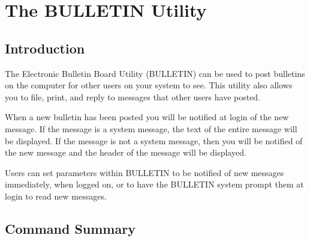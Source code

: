 \chapter{The BULLETIN Utility}
\section{Introduction}
 
The Electronic Bulletin Board Utility (BULLETIN) can be used to post
bulletins on the computer for other users on your system to see.  This
utility also allows you to file, print, and reply to messages that other
users have posted.
 
When a new bulletin has been posted you will be notified at login of the
new message.  If the message is a system message, the text of the entire
message will be displayed.  If the message is not a system message, then
you will be notified of the new message and the header of the message
will be displayed.
 
Users can set parameters within BULLETIN to be notified of new messages
immediately, when logged on, or to have the BULLETIN system prompt them
at login to read new messages.
 
\section{Command Summary}
 
